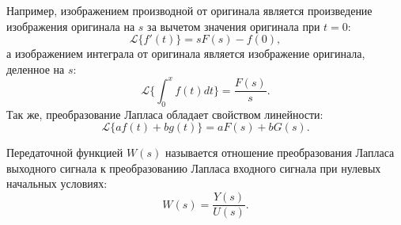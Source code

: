 Например, изображением производной от оригинала является произведение изображения оригинала на $s$ за вычетом значения оригинала при $t=0$:
\begin{equation}
	\mathcal{L}\{f'(t)\} = sF(s) - f(0),
\end{equation}
а изображением интеграла от оригинала является изображение оригинала, деленное на $s$:
\begin{equation}
	\mathcal{L}\{\int_{0}^{x} f(t)dt\}=\frac{F(s)}{s}.
\end{equation}
Так же, преобразование Лапласа обладает свойством линейности:
\begin{equation}
	\mathcal{L}\{af(t)+bg(t)\}=aF(s)+bG(s).
\end{equation}

Передаточной функцией $W(s)$ называется отношение преобразования Лапласа выходного сигнала к преобразованию Лапласа входного сигнала при нулевых начальных условиях:
\begin{equation}
	W(s) = \frac{Y(s)}{U(s)}.
\end{equation}

